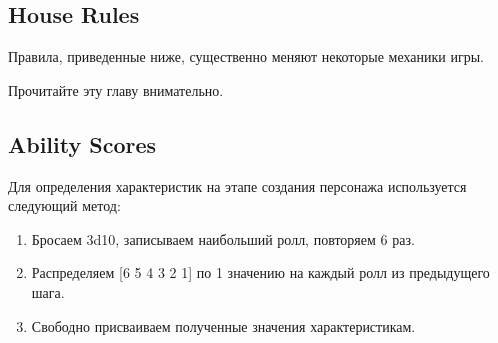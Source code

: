 \documentclass[a4paper,11pt]{book}
\let\oldtabularx\tabularx
\let\endoldtabularx\endtabularx
\renewenvironment{tabularx}{
        \AlegreyaSansOsF
        \bigskip
        \noindent
        \rowcolors{2}{}{white!94!blue}
        \oldtabularx
        } {
        \endoldtabularx
        \medskip
        }
\begin{document}
\begin{multicols}{2}
\chapter{House Rules}

Правила, приведенные ниже, существенно меняют некоторые механики игры.

Прочитайте эту главу внимательно.

\section{Ability Scores}

Для определения характеристик на этапе создания персонажа используется следующий метод:

\begin{enumerate}
    \item Бросаем 3d10, записываем наибольший ролл, повторяем 6 раз.
    \item Распределяем [6 5 4 3 2 1] по 1 значению на каждый ролл из предыдущего шага.
    \item Свободно присваиваем полученные значения характеристикам.
\end{enumerate}



%
%
%
%


\end{multicols}
\end{document}
